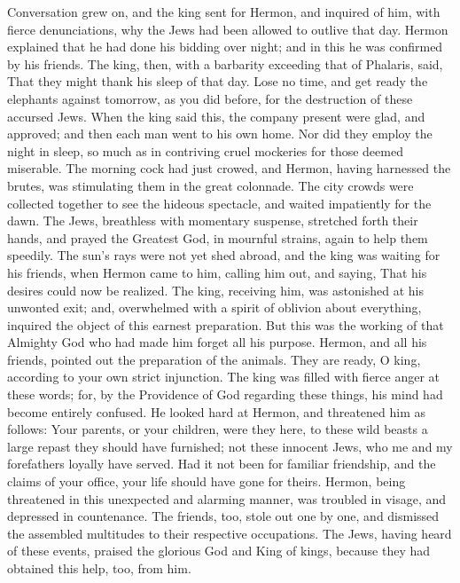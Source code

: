{Conversation grew on, and the king sent for Hermon, and inquired of him, with fierce denunciations, why the Jews had been allowed to outlive that day.
Hermon explained that he had done his bidding over night; and in this he was confirmed by his friends.
The king, then, with a barbarity exceeding that of Phalaris, said, That they might thank his sleep of that day. Lose no time, and get ready the elephants against tomorrow, as you did before, for the destruction of these accursed Jews.
When the king said this, the company present were glad, and approved; and then each man went to his own home.
Nor did they employ the night in sleep, so much as in contriving cruel mockeries for those deemed miserable.
The morning cock had just crowed, and Hermon, having harnessed the brutes, was stimulating them in the great colonnade.
The city crowds were collected together to see the hideous spectacle, and waited impatiently for the dawn.
The Jews, breathless with momentary suspense, stretched forth their hands, and prayed the Greatest God, in mournful strains, again to help them speedily.
The sun’s rays were not yet shed abroad, and the king was waiting for his friends, when Hermon came to him, calling him out, and saying, That his desires could now be realized.
The king, receiving him, was astonished at his unwonted exit; and, overwhelmed with a spirit of oblivion about everything, inquired the object of this earnest preparation.
But this was the working of that Almighty God who had made him forget all his purpose.
Hermon, and all his friends, pointed out the preparation of the animals. They are ready, O king, according to your own strict injunction.
The king was filled with fierce anger at these words; for, by the Providence of God regarding these things, his mind had become entirely confused. He looked hard at Hermon, and threatened him as follows:
Your parents, or your children, were they here, to these wild beasts a large repast they should have furnished; not these innocent Jews, who me and my forefathers loyally have served.
Had it not been for familiar friendship, and the claims of your office, your life should have gone for theirs.
Hermon, being threatened in this unexpected and alarming manner, was troubled in visage, and depressed in countenance.
The friends, too, stole out one by one, and dismissed the assembled multitudes to their respective occupations.
The Jews, having heard of these events, praised the glorious God and King of kings, because they had obtained this help, too, from him.
}
